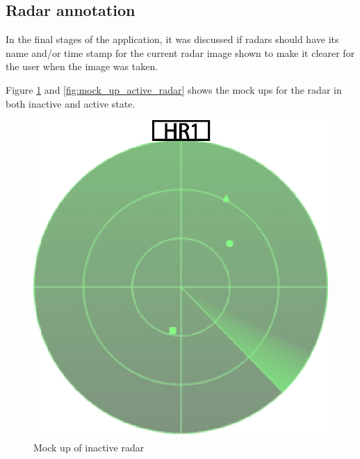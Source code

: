\subsection{Radar annotation}
In the final stages of the application, it was discussed if radars should have its name and/or time stamp for the current radar image shown to make it clearer for the user when the image was taken.

Figure \ref{fig:mock_up_inactive_radar} and \ref{fig:mock_up_active_radar} shows the mock ups for the radar in both inactive and active state.
\begin{figure}[htbp]
  \begin{minipage}[b]{0.5\linewidth}
    \centering
    \includegraphics[width=\linewidth]{figure/radar1.eps}
    \caption{Mock up of inactive radar}
    \label{fig:mock_up_inactive_radar}
  \end{minipage}
  \hspace{0.5cm}
  \begin{minipage}[b]{0.5\linewidth}
    \centering

\end{minipage}
\end{figure}
